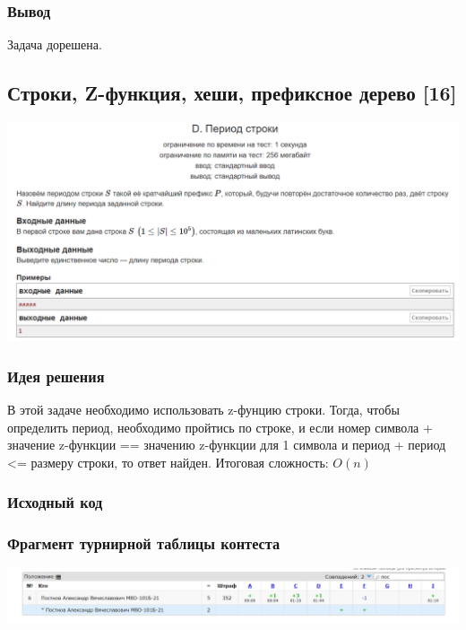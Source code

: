 \subsubsection*{Вывод}
Задача дорешена.

\vspace{20pt}

\pagebreak

\subsection*{Строки, Z-функция, хеши, префиксное дерево [16]}
\begin{center}
\includegraphics[width=\textwidth]{statements/18.png}
\end{center}
\subsubsection*{Идея решения}
В этой задаче необходимо использовать z-фунцию строки. Тогда, чтобы определить период, необходимо пройтись по строке, и если номер символа + значение z-функции == значению z-функции для 1 символа и период + период <= размеру строки, то ответ найден.
Итоговая сложность: $O(n)$
\subsubsection*{Исходный код}


\subsubsection*{Фрагмент турнирной таблицы контеста}
\begin{center}
\includegraphics[width=\textwidth]{standings/18.png}\newline\noindent
\end{center}

